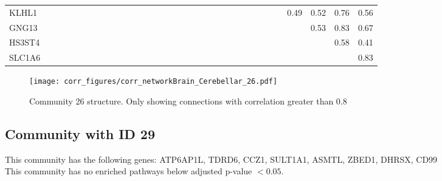 \begin{longtable}{lrrrrrrrrrrrrrrrrrrrrrrrrrrrrrrrr}
KLHL1    &            &                &                &              &              &             &             &             &             &            &              &             &           &             &              &             &             &              &              &               &            &            &             &           &            &             &               &             &        0.49 &         0.52 &         0.76 &        0.56 \\
GNG13    &            &                &                &              &              &             &             &             &             &            &              &             &           &             &              &             &             &              &              &               &            &            &             &           &            &             &               &             &             &         0.53 &         0.83 &        0.67 \\
HS3ST4   &            &                &                &              &              &             &             &             &             &            &              &             &           &             &              &             &             &              &              &               &            &            &             &           &            &             &               &             &             &              &         0.58 &        0.41 \\
SLC1A6   &            &                &                &              &              &             &             &             &             &            &              &             &           &             &              &             &             &              &              &               &            &            &             &           &            &             &               &             &             &              &              &        0.83 \\
\end{longtable}


\begin{figure}[h!]
\centering
\texttt{[image: corr\_figures/corr\_networkBrain\_Cerebellar\_26.pdf]}
\caption{Community 26 structure. Only showing connections with correlation greater than 0.8}
\end{figure}




\subsection*{Community with ID 29}
This community has the following genes: ATP6AP1L, TDRD6, CCZ1, SULT1A1, ASMTL, ZBED1, DHRSX, CD99
\\
This community has no enriched pathways below adjusted p-value $< 0.05$.

